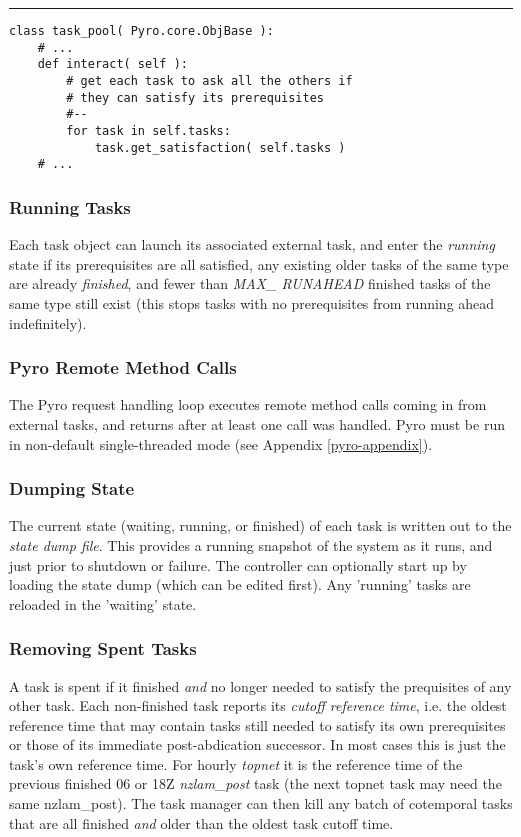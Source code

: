 \documentclass[11pt,a4paper]{article}
\begin{document}
{\small
\noindent
\rule{5cm}{.2mm}
\begin{lstlisting}
class task_pool( Pyro.core.ObjBase ):
    # ...
    def interact( self ):
        # get each task to ask all the others if 
        # they can satisfy its prerequisites
        #--
        for task in self.tasks:
            task.get_satisfaction( self.tasks )
    # ...
\end{lstlisting}
}

\subsubsection{Running Tasks}

Each task object can launch its associated external task, and enter the
{\em running} state if its prerequisites are all satisfied, any existing
older tasks of the same type are already {\em finished}, and fewer than
{\em MAX\_ RUNAHEAD} finished tasks of the same type still exist (this
stops tasks with no prerequisites from running ahead indefinitely).

\subsubsection{Pyro Remote Method Calls}

The Pyro request handling loop executes remote method calls coming in
from external tasks, and returns after at least one call was handled.
Pyro must be run in non-default single-threaded mode (see Appendix
\ref{pyro-appendix}).

\subsubsection{Dumping State} 

The current state (waiting, running, or finished) of each task is
written out to the {\em state dump file}.  This provides a running
snapshot of the system as it runs, and just prior to shutdown or
failure. The controller can optionally start up by loading the state
dump (which can be edited first). Any 'running' tasks are reloaded in
the 'waiting' state.

\subsubsection{Removing Spent Tasks} 

A task is spent if it finished {\em and} no longer needed to satisfy the
prequisites of any other task. Each non-finished task reports its {\em
cutoff reference time}, i.e. the oldest reference time that may contain
tasks still needed to satisfy its own prerequisites or those of its
immediate post-abdication successor.  In most cases this is just the
task's own reference time. For hourly {\em topnet} it is the reference
time of the previous finished 06 or 18Z {\em nzlam\_post} task (the next
topnet task may need the same nzlam\_post). The task manager can then
kill any batch of cotemporal tasks that are all finished {\em and} older
than the oldest task cutoff time.
\end{document}

